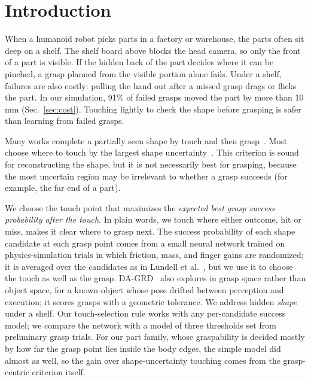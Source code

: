 \documentclass[conference]{IEEEtran}
\begin{document}
\section{Introduction}

When a humanoid robot picks parts in a factory or warehouse, the parts often sit deep on a shelf. The shelf board above blocks the head camera, so only the front of a part is visible. If the hidden back of the part decides where it can be pinched, a grasp planned from the visible portion alone fails. Under a shelf, failures are also costly: pulling the hand out after a missed grasp drags or flicks the part. In our simulation, 91\% of failed grasps moved the part by more than 10\,mm (Sec.~\ref{sec:cost}). Touching lightly to check the shape before grasping is safer than learning from failed grasps.

Many works complete a partially seen shape by touch and then grasp~\cite{rustler2022actvh,rustler2023efficient,defarias2021simultaneous,rustler2026shapegrasp}. Most choose where to touch by the largest shape uncertainty~\cite{rustler2022actvh,dragiev2013uncertainty,kissoum2023tactile}. This criterion is sound for reconstructing the shape, but it is not necessarily best for grasping, because the most uncertain region may be irrelevant to whether a grasp succeeds (for example, the far end of a part).

We choose the touch point that maximizes the \emph{expected best grasp success probability after the touch}. In plain words, we touch where either outcome, hit or miss, makes it clear where to grasp next. The success probability of each shape candidate at each grasp point comes from a small neural network trained on physics-simulation trials in which friction, mass, and finger gains are randomized; it is averaged over the candidates as in Lundell et al.~\cite{lundell2019robust}, but we use it to choose the touch as well as the grasp. DA-GRD~\cite{wang2026dagrd} also explores in grasp space rather than object space, for a known object whose pose drifted between perception and execution; it scores grasps with a geometric tolerance. We address hidden \emph{shape} under a shelf. Our touch-selection rule works with any per-candidate success model; we compare the network with a model of three thresholds set from preliminary grasp trials. For our part family, whose graspability is decided mostly by how far the grasp point lies inside the body edges, the simple model did almost as well, so the gain over shape-uncertainty touching comes from the grasp-centric criterion itself.
\end{document}
